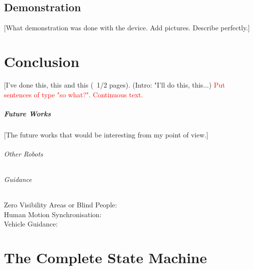 \documentclass[oneside, a4paper, 12pt]{memoir}
\begin{document}
	\section{Demonstration}
	
	[What demonstration was done with the device. Add pictures. Describe perfectly.]

\chapter{Conclusion}

[I've done this, this and this (~1/2 pages). (Intro: "I'll do this, this...) \textcolor{red}{Put sentences of type "so what?". Continuous text.}

	\paragraph{Future Works}
	[The future works that would be interesting from my point of view.]
	
		\subparagraph{Other Robots}
		\subparagraph{Guidance}
			
			\begin{description}
				\item[Zero Visibility Areas or Blind People:]
				\item[Human Motion Synchronisation:]
				\item[Vehicle Guidance:]
			\end{description}
			


\appendix

\chapter{The Complete State Machine}
\label{app:complete_state_machine}
\end{document}
